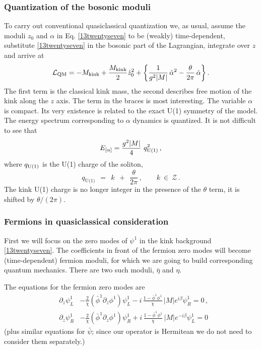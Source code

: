 \documentclass[epsfig,12pt]{article}
\def\beq{\begin{equation}}
\def\eeq{\end{equation}}
\def\beqn{\begin{eqnarray}}
\def\eeqn{\end{eqnarray}}
\def\beqn{\begin{eqnarray}}
\def\eeqn{\end{eqnarray}}
\def\beq{\begin{equation}}
\def\eeq{\end{equation}}
\newcommand{\mc}[1]{\mathcal{#1}}
\begin{document}
\subsubsection{Quantization of the bosonic moduli}

	To carry out  conventional
	quasiclassical quantization we, as usual,
	assume the moduli $z_0$ and $\alpha$ in Eq. \eqref{13twentyseven}
	to be (weakly) time-dependent, substitute  \eqref{13twentyseven}
	in the bosonic part of the Lagrangian, integrate over $z$
	and arrive at
\beq
{\cal L}_{\rm QM} = -M_{\rm kink} +\frac{M_{\rm kink}}{2} \dot z_0^2 
+\left\{\frac{1}{g^2|M|}\, \dot\alpha^2  
-\frac{\theta}{2\pi}\,\dot\alpha
\right\}.
\label{13twentynine}
\eeq
	The first term is the classical kink mass, the second describes
	free motion of the kink along the $z$ axis.
	The term in the braces is most interesting.
	The variable $\alpha$ is compact.
	Its very existence is related to the exact U(1) symmetry of the model.
	The energy spectrum corresponding
	to $\alpha$ dynamics is quantized.
	It is not difficult to see that
\beq
E_{[\alpha ]}= \frac{g^2 |M|}{4}\,\, q_{\rm U(1)}^2\,,
\label{13thirty}
\eeq
	where 
$ q_{\rm U(1)}$ 
	is the U(1) charge of the soliton,
\beq
 q_\text{U(1)} ~~=~~ k ~~+~~ \frac{\theta}{2\pi}\,,\qquad k ~\in~ \mc{Z}\,.
\label{13thirtyone}
\eeq
	The kink U(1) charge is no longer integer
	in the presence of the $\theta$ term, it is shifted by $\theta/(2\pi )$.


\subsubsection{Fermions in quasiclassical consideration}

	First we will  focus on the 
	zero modes of $\psi^1$ in the kink background \eqref{13twentyseven}.
	The coefficients
	in front of the fermion zero modes will become (time-dependent)
	 fermion moduli, for which we are going to build
	corresponding quantum mechanics. 
	There are two such moduli, $\bar\eta$ and $\eta$.

	The equations for the fermion zero modes are
\beqn
&\partial_z\psi_L^1&    - \frac{2}{\chi}\left(\bar\phi^1\partial_z\phi^1
\right)\psi_L^1 -i\,\frac{1-\bar\phi^1\phi^1}{\chi}\, |M| e^{i\beta}\psi_R^1
=0\,,
\nonumber\\[3mm]
&\partial_z\psi_R^1&   - \frac{2}{\chi}\left(\bar\phi^1\partial_z\phi^1
\right)\psi_R^1 + i\,\frac{1-\bar\phi^1\phi^1}{\chi}\, |M| e^{- i\beta}\psi_L^1=0
\label{13fourtyfour}
\eeqn
	(plus similar equations for $\bar\psi$; since our operator is 
	Hermitean we do not need to consider them separately.)
\end{document}
